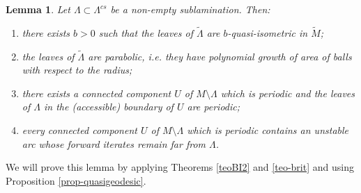 \documentclass[11pt]{amsart} %
\newcommand{\Lam}{\Lambda}
\numberwithin{equation}{section}
\newtheorem{lemma}[equation]{Lemma}
\theoremstyle{remark}
\begin{document}
\begin{lemma}\label{l.verticallamination} 
Let $\Lambda \subset \Lambda^{cs}$ be a  non-empty sublamination. Then: 
\begin{enumerate}
\item\label{it-quasiisomleaves} there exists $b>0$ such that the leaves of $\tilde \Lambda$ are $b$-quasi-isometric in $\tilde M$;
\item\label{it-polynomialarea} the leaves of $\tilde \Lambda$ are parabolic, i.e. they have polynomial growth of area of balls with respect to the radius;
\item\label{it-periodic} there exists a connected component $U$ of $M \setminus \Lam$ which is periodic and the leaves of $\Lam$ in the (accessible) boundary of $U$ are periodic;
\item\label{it-unst} every connected component $U$ of $M\setminus \Lam$ which is periodic contains an unstable arc whose forward iterates remain far from $\Lambda$.
\end{enumerate}
\end{lemma}



We will prove this lemma by applying Theorems \ref{teoBI2} and \ref{teo-brit} and using Proposition \ref{prop-quasigeodesic}. %
\end{document}
